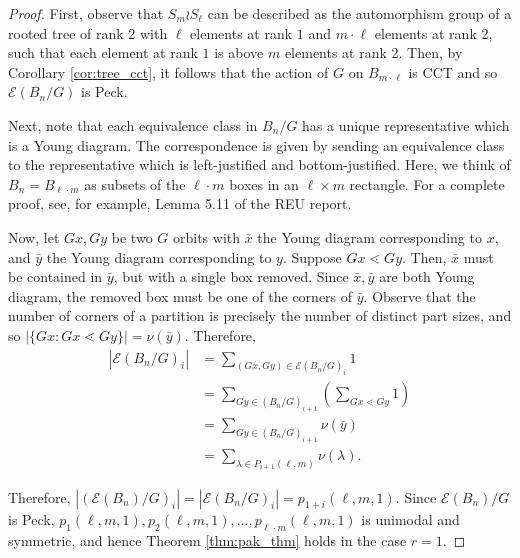 \documentclass[smallextended, envcountsame, numbook]{svjour3}
\theoremstyle{plain}
\theoremstyle{definition}
\theoremstyle{remark}
\numberwithin{equation}{section}
\begin{document}
\begin{proof}

First, observe that $S_m \wr S_\ell$ can be described as the automorphism group of a rooted tree of rank 2 with $\ell$ elements at rank $1$ and $m\cdot \ell$ elements at rank 2, such that each element at rank $1$ is above $m$ elements at rank 2. Then, by Corollary \ref{cor:tree_cct}, it follows that the action of $G$ on $B_{m \cdot \ell}$ is CCT and so $\mathcal E(B_n/G)$ is Peck.

Next, note that each equivalence class in $B_n/G$ has a unique representative which is a Young diagram. The correspondence is given by sending an equivalence class to the representative which is left-justified and bottom-justified.
Here, we think of $B_n = B_{\ell \cdot m}$ as subsets of the $\ell \cdot m$ boxes in an $\ell \times m$ rectangle. For a complete proof, see, for example, Lemma 5.11 of the REU report.

Now, let $Gx,Gy$ be two $G$ orbits with $\bar x$ the Young diagram corresponding to $x$, and $\bar y$ the Young diagram corresponding to $y$. Suppose $Gx \lessdot Gy$. Then, $\bar x$ must be contained in $\bar y$, but with a single box removed. Since $\bar x,\bar y$ are both Young diagram, the removed box must be one of the corners of $\bar y$. Observe that the number of corners of a partition is precisely the number of distinct part sizes, and so $|\{Gx\colon Gx \lessdot Gy\}| = \nu(\bar y)$. Therefore,
\begin{align*}
  |\mathcal E(B_n/G)_i| &= \sum_{(Gx,Gy) \in \mathcal E(B_n/G)_i} 1 
  \\
  &= \sum_{Gy \in (B_n/G)_{i+1}} \left(\sum_{Gx \lessdot Gy}^{} 1 \right) 
  \\
  &= \sum_{Gy \in (B_n/G)_{i+1}}\nu(\bar y) 
  \\
  &=  \sum_{\lambda \in P_{i+1}(\ell,m)} \nu(\lambda).
\end{align*}

Therefore, $|(\mathcal E(B_n)/G)_i| = |\mathcal E(B_n/G)_i| = p_{1+i}(\ell,m,1)$. Since $\mathcal E(B_n)/G$ is Peck,
\linebreak
$p_1(\ell,m,1), p_{2}(\ell,m,1),\ldots, p_{\ell\cdot m}(\ell,m,1)$ is unimodal and symmetric, and hence Theorem \ref{thm:pak_thm} holds in the case $r = 1$.
\end{proof}






\end{document}
